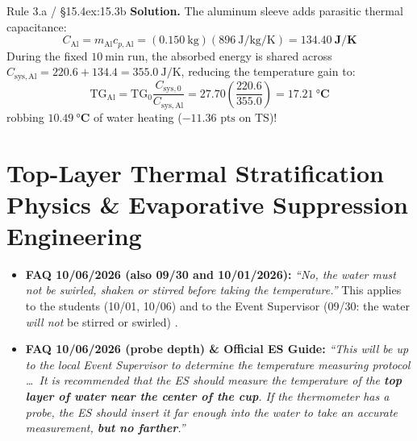 \begin{twocol}[0.52]
\begin{workedexample}{Rule 3.a / §15.4}{ex:15.3b}
\textbf{Solution.} The aluminum sleeve adds parasitic thermal capacitance:
\[
  C_{\mathrm{Al}} = m_{\mathrm{Al}}c_{p,\mathrm{Al}} = (\SI{0.150}{\kilogram})(\SI{896}{\joule\per\kilogram\per\kelvin}) = \mathbf{\SI{134.40}{\joule\per\kelvin}}
\]
During the fixed $\SI{10}{\minute}$ run, the absorbed energy is shared across $C_{\mathrm{sys,Al}} = 220.6 + 134.4 = \SI{355.0}{\joule\per\kelvin}$, reducing the temperature gain to:
\[
  \mathrm{TG}_{\mathrm{Al}} = \mathrm{TG}_0\frac{C_{\mathrm{sys},0}}{C_{\mathrm{sys,Al}}} = 27.70\!\left(\frac{220.6}{355.0}\right) = \mathbf{\SI{17.21}{\celsius}}
\]
robbing $\mathbf{\SI{10.49}{\celsius}}$ of water heating ($-11.36\text{ pts}$ on $\mathrm{TS}$)!
\end{workedexample}
\end{twocol}

\section{Top-Layer Thermal Stratification Physics \& Evaporative Suppression Engineering}\label{sec:15.5}

\begin{rulebox}
\begin{itemize}
  \item \textbf{FAQ 10/06/2026 (also 09/30 and 10/01/2026):} \textit{``No, the water must not be swirled, shaken or stirred before taking the temperature.''} This applies to the students (10/01, 10/06) and to the Event Supervisor (09/30: the water \emph{will not} be stirred or swirled) .
  \item \textbf{FAQ 10/06/2026 (probe depth) \& Official ES Guide:} \textit{``This will be up to the local Event Supervisor to determine the temperature measuring protocol \ldots\ It is recommended that the ES should measure the temperature of the \textbf{top layer of water near the center of the cup}. If the thermometer has a probe, the ES should insert it far enough into the water to take an accurate measurement, \textbf{but no farther}.''} 
\end{itemize}
\end{rulebox}

